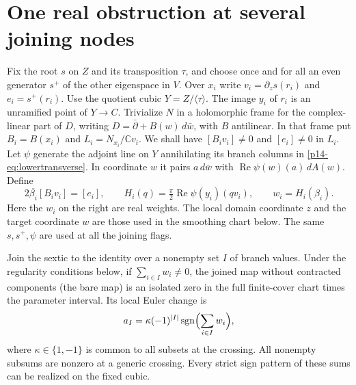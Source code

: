 \section{One real obstruction at several joining nodes}\label{p14-sec:joins}

Fix the root $s$ on $Z$ and its transposition $\tau$, and choose once
and for all an even generator $s^+$ of the other eigenspace in $V$.
Over $x_i$ write $v_i=\partial_zs(r_i)$ and $e_i=s^+(r_i)$.
Use the quotient cubic $Y=Z/\langle\tau\rangle$. The image $y_i$
of $r_i$ is an unramified point of $Y\to C$. Trivialize $N$ in a
holomorphic frame for the complex-linear part of $D$, writing
$D=\bar\partial+B(w)\,d\bar w$, with $B$ antilinear. In that
frame put $B_i=B(x_i)$ and $L_i=N_{x_i}/\mathbb Cv_i$. We shall have
$[B_i v_i]\ne0$ and $[e_i]\ne0$ in $L_i$. Let $\psi$ generate
the adjoint line on $Y$ annihilating its branch columns in
\eqref{p14-eq:lowertransverse}. In coordinate $w$ it pairs
$a\,d\bar w$ with $\operatorname{Re}\psi(w)(a)\,dA(w)$.
Define
\begin{equation}\label{p14-eq:branchweights}
 2\overline{\beta_i}[B_i v_i]=[e_i],\qquad
 H_i(q)=\tfrac{\pi}{2}\operatorname{Re}\psi(y_i)(qv_i),
 \qquad w_i=H_i(\beta_i).
\end{equation}
Here the $w_i$ on the right are real weights. The local domain coordinate
$z$ and the target coordinate $w$ are those used in the smoothing chart
below. The same $s,s^+,\psi$ are used at all the joining flags.

\begin{proposition}\label{p14-prop:signs}
Join the sextic to the identity over a nonempty set $I$ of branch
values. Under the regularity conditions below, if
$\sum_{i\in I} w_i\ne0$, the joined map without contracted components (the bare map) is an isolated zero in the full
finite-cover chart times the parameter interval. Its local Euler change is
\begin{equation}\label{p14-eq:localsubsetsign}
              a_I=\kappa(-1)^{|I|}
                     \operatorname{sgn}\Bigl(\sum_{i\in I} w_i\Bigr),
\end{equation}
where $\kappa\in\{1,-1\}$ is common to all subsets at the crossing.
All nonempty subsums are nonzero at a generic crossing. Every
strict sign pattern of these sums can be realized on the fixed cubic.
\end{proposition}


